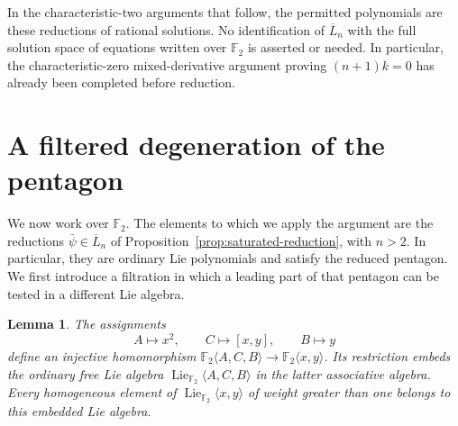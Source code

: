 \documentclass[11pt]{article}
\newcommand{\F}{{\mathbb F_2}}
\newcommand{\Lie}{\operatorname{Lie}}
\newtheorem{lemma}[theorem]{Lemma}
\theoremstyle{definition}
\theoremstyle{remark}
\numberwithin{equation}{section}
\begin{document}
In the characteristic-two arguments that follow, the permitted
polynomials are these reductions of rational solutions.  No
identification of \(\overline L_n\) with the full solution space of
equations written over \(\F\) is asserted or needed.  In particular,
the characteristic-zero mixed-derivative argument proving
\((n+1)k=0\) has already been completed before reduction.

\section{A filtered degeneration of the pentagon}
\label{sec:degeneration}

We now work over $\F$.  The elements to which we apply the
argument are the reductions $\bar\psi\in\overline L_n$ of
Proposition~\ref{prop:saturated-reduction}, with $n>2$.  In particular,
they are ordinary Lie polynomials and satisfy the reduced pentagon.
We first introduce a filtration in which a leading part of that pentagon
can be tested in a different Lie algebra.

\begin{samepage}
\begin{lemma}\label{lem:abc-free}
The assignments
\[
 A\longmapsto x^2,\qquad C\longmapsto[x,y],\qquad B\longmapsto y
\]
define an injective homomorphism
$\F\langle A,C,B\rangle\longrightarrow\F\langle x,y\rangle$.
Its restriction embeds the ordinary free Lie algebra
$\Lie_{\F}\langle A,C,B\rangle$ in the latter associative algebra.
Every homogeneous element of $\Lie_{\F}\langle x,y\rangle$ of weight
greater than one belongs to this embedded Lie algebra.
\end{lemma}
\end{samepage}
\end{document}
